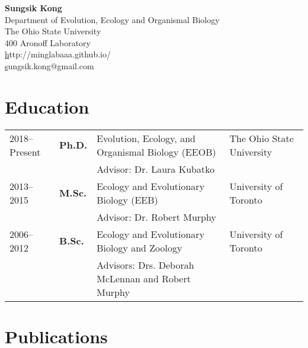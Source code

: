 \documentclass[11pt]{article}
\begin{document}
\pagestyle{plain}

\begin{center}
\huge \textbf{Sungsik Kong}\\
\vspace{0.2cm}
\large Department of Evolution, Ecology and Organismal Biology\\
\large The Ohio State University\\
\large 400 Aronoff Laboratory\\
\small \href{http://minglabaaa.github.io}http://minglabaaa.github.io/\\
\small \href{mailto:sungsik.kong@gmail.com}sungsik.kong@gmail.com
\end{center}




\hspace{0pt}




\section*{Education}

\begin{longtable}{p{}  p{} p{} p{}}
2018--Present & \textbf{Ph.D.} & Evolution, Ecology, and Organismal Biology (EEOB) & The Ohio State University\\
 & & Advisor: Dr. Laura Kubatko\\
2013--2015 & \textbf{M.Sc.} & Ecology and Evolutionary Biology (EEB) & University of Toronto\\
 & & Advisor: Dr. Robert Murphy\\
2006--2012 & \textbf{B.Sc.} & Ecology and Evolutionary Biology and Zoology & University of Toronto\\
 & & Advisors: Drs. Deborah McLennan and Robert Murphy
\end{longtable}



\hspace{0pt}


\section*{Publications}
\end{document}
